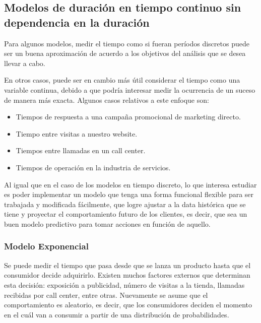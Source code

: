 \documentclass[
]{book}
\begin{document}
\subsection{Modelos de duración en tiempo continuo sin dependencia en la duración}\label{modelos-de-duraciuxf3n-en-tiempo-continuo-sin-dependencia-en-la-duraciuxf3n}

Para algunos modelos, medir el tiempo como si fueran períodos discretos
puede ser un buena aproximación de acuerdo a los objetivos del análisis
que se desea llevar a cabo.

En otros casos, puede ser en cambio más útil considerar el tiempo como
una variable continua, debido a que podría interesar medir la ocurrencia
de un suceso de manera más exacta. Algunos casos relativos a este
enfoque son:

\begin{itemize}
\item
  Tiempos de respuesta a una campaña promocional de marketing directo.
\item
  Tiempo entre visitas a nuestro website.
\item
  Tiempos entre llamadas en un call center.
\item
  Tiempos de operación en la industria de servicios.
\end{itemize}

Al igual que en el caso de los modelos en tiempo discreto, lo que
interesa estudiar es poder implementar un modelo que tenga una forma
funcional flexible para ser trabajada y modificada fácilmente, que logre
ajustar a la data histórica que se tiene y proyectar el comportamiento
futuro de los clientes, es decir, que sea un buen modelo predictivo para
tomar acciones en función de aquello.

\subsubsection*{Modelo Exponencial}\label{modelo-exponencial}

Se puede medir el tiempo que pasa desde que se lanza un producto hasta
que el consumidor decide adquirirlo. Existen muchos factores externos
que determinan esta decisión: exposición a publicidad, número de visitas
a la tienda, llamadas recibidas por call center, entre otras. Nuevamente
se asume que el comportamiento es aleatorio, es decir, que los
consumidores deciden el momento en el cuál van a consumir a partir de
una distribución de probabilidades.
\end{document}
